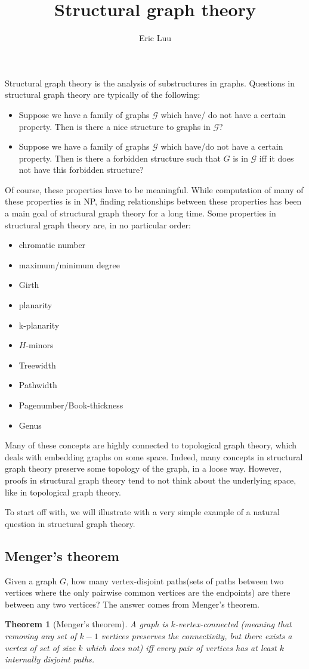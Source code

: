 \documentclass[]{article}
\title{Structural graph theory}
\author{Eric Luu}
\newtheorem{theorem}{Theorem}
\theoremstyle{definition}
\numberwithin{theorem}{section}
\numberwithin{equation}{section}
\begin{document}
Structural graph theory is the analysis of substructures in graphs. Questions in structural graph theory are typically of the following:

\begin{itemize}
	\item Suppose we have a family of graphs $\mathcal{G}$ which have/ do not have a certain property. Then is there a nice structure to graphs in $\mathcal{G}$?
	\item Suppose we have a family of graphs $\mathcal{G}$ which have/do not have a certain property. Then is there a forbidden structure such that $G$ is in $\mathcal{G}$ iff it does not have this forbidden structure?
\end{itemize}
Of course, these properties have to be meaningful. While computation of many of these properties is in NP, finding relationships between these properties has been a main goal of structural graph theory for a long time. 
Some properties in structural graph theory are, in no particular order:

\begin{itemize}
	\item chromatic number
	\item maximum/minimum degree
	\item Girth
	\item planarity
	\item k-planarity
	\item $H$-minors
	\item Treewidth
	\item Pathwidth
	\item Pagenumber/Book-thickness
	\item Genus
\end{itemize}
Many of these concepts are highly connected to topological graph theory, which deals with embedding graphs on some space. Indeed, many concepts in structural graph theory preserve some topology of the graph, in a loose way. However, proofs in structural graph theory tend to not think about the underlying space, like in topological graph theory.

To start off with, we will illustrate with a very simple example of a natural question in structural graph theory. 

\subsection{Menger's theorem}
Given a graph $G$, how many vertex-disjoint paths(sets of paths between two vertices where the only pairwise common vertices are the endpoints) are there between any two vertices? The answer comes from Menger's theorem.
\begin{theorem}[Menger's theorem]
	A graph is $k$-vertex-connected (meaning that removing any set of $k-1$ vertices preserves the connectivity, but there exists a vertex of set of size $k$ which does not) iff every pair of vertices has at least $k$ internally disjoint paths.
\end{theorem}
\end{document}

